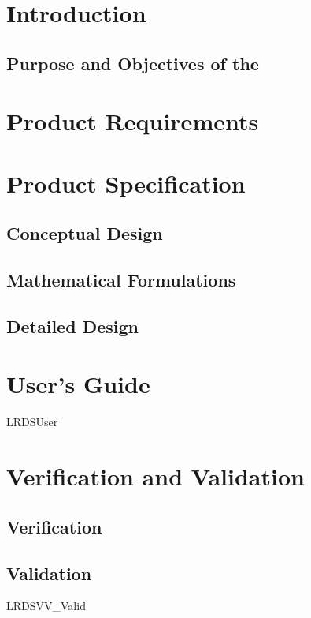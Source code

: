 


\chapter{Introduction}\label{ch:LRDSintro}

\section{Purpose and Objectives of the \LRDSDesc}




\chapter{Product Requirements}\label{ch:LRDSreqt}




\chapter{Product Specification}\label{ch:LRDSspec}

\section{Conceptual Design}

\section{Mathematical Formulations}
\label{sec:Lrdsmath}

\section{Detailed Design}



\chapter{User's Guide}\label{ch:LRDSuser}
 {LRDSUser}
\chapter{Verification and
Validation}\label{ch:LRDSivv}

\section{Verification}


\section{Validation}
 {LRDSVV_Valid}
